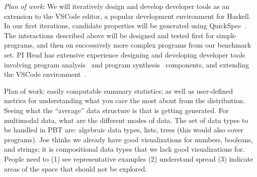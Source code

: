 \textit{Plan of work}: We will iteratively design and develop developer tools as an extension to the VSCode editor, a popular development environment for Haskell. In our first iterations, candidate properties will be generated using QuickSpec~\cite{claessen2010quickspec}. The interactions described above will be designed and tested first for simple programs, and then on successively more complex programs from our benchmark set. PI Head has extensive experience designing and developing developer tools involving program analysis~\cite{head2018interactive,head2019managing} and program synthesis~\cite{head2017writing} components, and extending the VSCode environment~\cite{head2020composing}.   




Plan of work: easily computable summary statistics; as well as user-defined metrics for understanding what you care the most about from the distribution. Seeing what the “average” data structure is that is getting generated. For multimodal data, what are the different modes of data. The set of data types to be handled in PBT are: algebraic data types, lists, trees (this would also cover programs). Joe thinks we already have good visualizations for numbers, booleans, and strings; it is compositional data types that we lack good visualizations for. People need to (1) see representative examples (2) understand spread (3) indicate areas of the space that should not be explored.   

